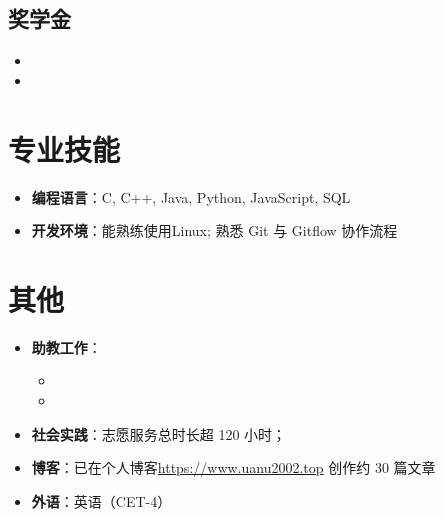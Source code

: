 \documentclass{resume}
\begin{document}
\subsection{\textbf{奖学金}}
\begin{itemize}
  \item {}
  \item {}
\end{itemize}

\section{专业技能}
\begin{itemize}
  \item \textbf{编程语言}：C, C++, Java, Python, JavaScript, SQL
  \item \textbf{开发环境}：能熟练使用Linux; 熟悉 Git 与 Gitflow 协作流程
\end{itemize}

\section{其他}
\begin{itemize}
  \item \textbf{助教工作}：
        \begin{itemize}
          \item {}
	     \item {}
        \end{itemize}
  \item \textbf{社会实践}：志愿服务总时长超 120 小时；
  \item \textbf{博客}：已在个人博客\url{https://www.uanu2002.top} 创作约 30 篇文章
  \item \textbf{外语}：英语（CET-4）
\end{itemize}
\end{document}
